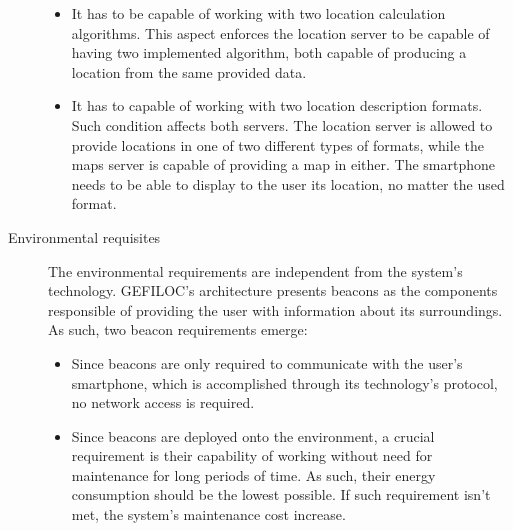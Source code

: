 \begin{description}
\begin{itemize}
 
\item It has to be capable of working with two location calculation algorithms. This aspect enforces the location server to be capable of having two implemented algorithm, both capable of producing a location from the same provided data.  
 
 
\item It has to capable of working with two location description formats. Such condition affects both servers. The location server is allowed to provide locations in one of two different types of formats, while the maps server is capable of providing a map in either. 
The smartphone needs to be able to display to the user its location, no matter the used format. 
\end{itemize} 
 
 
 
 
\item [Environmental requisites] The environmental requirements are independent from the system's technology. GEFILOC's architecture presents beacons as the components responsible of providing the user with information about its surroundings. As such, two beacon requirements emerge: 
\begin{itemize} 
\item Since beacons are only required to communicate with the user's smartphone, which is accomplished through its technology's protocol, no network access is required. 
 
 
\item Since beacons are deployed onto the environment, a crucial requirement is their capability of working without need for maintenance for long periods of time. As such, their energy consumption should be the lowest possible. If such requirement isn't met, the system's maintenance cost increase.  
\end{itemize} 
 
 
\end{description} 
 